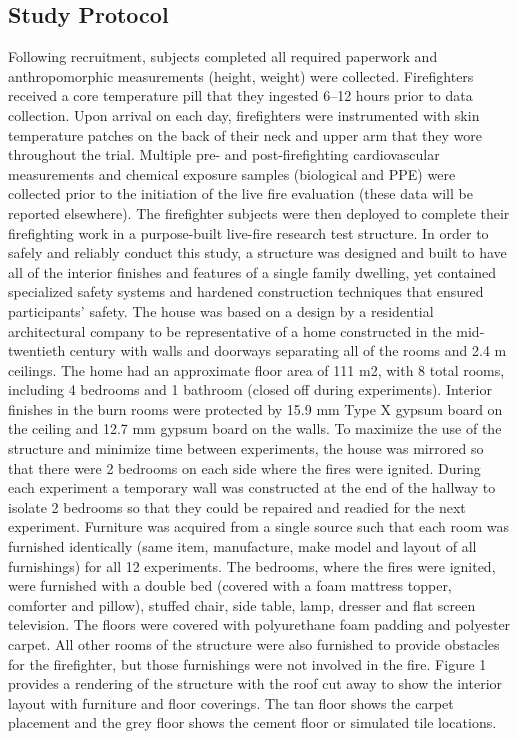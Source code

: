 \documentclass[12pt,oneside]{book}
\begin{document}
\subsection{Study Protocol}
Following recruitment, subjects completed all required paperwork and anthropomorphic measurements (height, weight) were collected.  Firefighters received a core temperature pill that they ingested 6–12 hours prior to data collection. Upon arrival on each day, firefighters were instrumented with skin temperature patches on the back of their neck and upper arm that they wore throughout the trial. Multiple pre- and post-firefighting cardiovascular measurements and chemical exposure samples (biological and PPE) were collected prior to the initiation of the live fire evaluation (these data will be reported elsewhere).  The firefighter subjects were then deployed to complete their firefighting work in a purpose-built live-fire research test structure. 
In order to safely and reliably conduct this study, a structure was designed and built to have all of the interior finishes and features of a single family dwelling, yet contained specialized safety systems and hardened construction techniques that ensured participants' safety. The house was based on a design by a residential architectural company to be representative of a home constructed in the mid-twentieth century with walls and doorways separating all of the rooms and 2.4 m ceilings. The home had an approximate floor area of 111 m2, with 8 total rooms, including 4 bedrooms and 1 bathroom (closed off during experiments). Interior finishes in the burn rooms were protected by 15.9 mm Type X gypsum board on the ceiling and 12.7 mm gypsum board on the walls. To maximize the use of the structure and minimize time between experiments, the house was mirrored so that there were 2 bedrooms on each side where the fires were ignited.  During each experiment a temporary wall was constructed at the end of the hallway to isolate 2 bedrooms so that they could be repaired and readied for the next experiment.  
Furniture was acquired from a single source such that each room was furnished identically (same item, manufacture, make model and layout of all furnishings) for all 12 experiments. The bedrooms, where the fires were ignited, were furnished with a double bed (covered with a foam mattress topper, comforter and pillow), stuffed chair, side table, lamp, dresser and flat screen television.  The floors were covered with polyurethane foam padding and polyester carpet.  All other rooms of the structure were also furnished to provide obstacles for the firefighter, but those furnishings were not involved in the fire. Figure 1 provides a rendering of the structure with the roof cut away to show the interior layout with furniture and floor coverings.  The tan floor shows the carpet placement and the grey floor shows the cement floor or simulated tile locations.  
\end{document}
